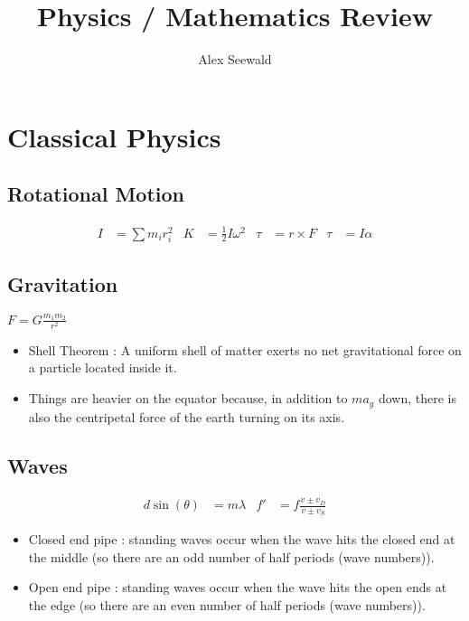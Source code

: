 \documentclass{article}
\author{Alex Seewald}
\title{Physics / Mathematics Review}
\begin{document}
\newlength{\lindent}
\setlength{\lindent}{1.3cm}

\maketitle

\section*{Classical Physics}

    \subsection*{Rotational Motion}
        \begin{align*}
             I &= \sum m_i r_i^2 &  K &= \frac{1}{2} I \omega^2 & \tau &= r \times F  & \tau &= I \alpha
        \end{align*}

    \subsection*{Gravitation}
        $ F = G \frac{m_1 m_2}{r^2} $
        \begin{itemize}[leftmargin=\lindent]
        \item Shell Theorem : A uniform shell of matter exerts no net gravitational
        force on a particle located inside it.
        \item Things are heavier on the equator because, in addition to $m a_g$ down, there
        is also the centripetal force of the earth turning on its axis.
        \end{itemize}

    \subsection*{Waves}
        \begin {align*}
            d \sin(\theta) &= m \lambda & f' &= f \frac{v \pm v_D}{v \pm v_S}
        \end{align*}
        \begin{itemize}[leftmargin=\lindent]
        \item Closed end pipe : standing waves occur when the wave hits the closed end at the middle (so
        there are an odd number of half periods (wave numbers)).
        \item Open end pipe : standing waves occur when the wave hits the open ends at the edge (so there
        are an even number of half periods (wave numbers)).
        \end{itemize}
\end{document}
